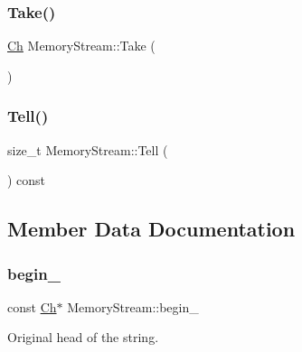 \mbox{\label{structMemoryStream_a14ff92deda5d39c9b166aaa07e82a0ee}} 
\subsubsection{\texorpdfstring{Take()}{Take()}}
{\footnotesize\ttfamily \hyperlink{structMemoryStream_a62a1cbd052c325c83dbdb387d2f89088}{Ch} Memory\+Stream\+::\+Take (\begin{DoxyParamCaption}{ }\end{DoxyParamCaption})\hspace{0.3cm}{\ttfamily [inline]}}

\mbox{\label{structMemoryStream_a2de1486742f0d44decda90a56bc43268}} 
\subsubsection{\texorpdfstring{Tell()}{Tell()}}
{\footnotesize\ttfamily size\+\_\+t Memory\+Stream\+::\+Tell (\begin{DoxyParamCaption}{ }\end{DoxyParamCaption}) const\hspace{0.3cm}{\ttfamily [inline]}}



\subsection{Member Data Documentation}
\mbox{\label{structMemoryStream_a91f0767b4f0ed2476d835e8344848a2f}} 
\subsubsection{\texorpdfstring{begin\+\_\+}{begin\_}}
{\footnotesize\ttfamily const \hyperlink{structMemoryStream_a62a1cbd052c325c83dbdb387d2f89088}{Ch}$\ast$ Memory\+Stream\+::begin\+\_\+}



Original head of the string. 

\mbox{\label{structMemoryStream_a55fb302ba0492419757e3ba318c8c654}} 
